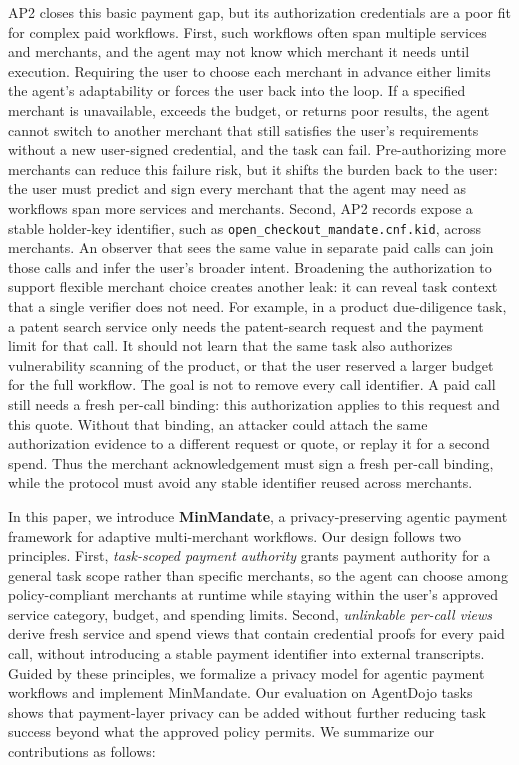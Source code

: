 \documentclass[letterpaper]{article}
\newcommand{\system}{MinMandate\xspace}
\begin{document}
AP2 closes this basic payment gap, but its authorization credentials are a poor fit for complex paid workflows. 
First, such workflows often span multiple services and merchants, and the agent may not know which merchant it needs until execution.
Requiring the user to choose each merchant in advance either limits the agent's adaptability or forces the user back into the loop. 
If a specified merchant is unavailable, exceeds the budget, or returns poor results, the agent cannot switch to another merchant that still satisfies the
user's requirements without a new user-signed credential, and the task can fail.
Pre-authorizing more merchants can reduce this failure risk, but it shifts the
burden back to the user: the user must predict and sign every merchant that the
agent may need as workflows span more services and merchants.
Second, AP2 records expose a stable holder-key identifier, such as \texttt{open\_checkout\_mandate.cnf.kid}, across merchants.
An observer that sees the same value in separate paid calls can join those calls and infer the user's broader intent. 
Broadening the authorization to support flexible merchant choice creates another leak: it can reveal task context that a single
verifier does not need. For example, in a product due-diligence task, a patent
search service only needs the patent-search request and the payment limit for
that call. It should not learn that the same task also authorizes vulnerability
scanning of the product, or that the user reserved a larger budget for the full
workflow.
The goal is not to remove every call identifier. A paid call still needs a
fresh per-call binding: this authorization applies to this request and this
quote. Without that binding, an attacker could attach the same authorization
evidence to a different request or quote, or replay it for a second spend.
Thus the merchant acknowledgement must sign a fresh per-call binding, while
the protocol must avoid any stable identifier reused across merchants.


In this paper, we introduce
\textbf{\system}, a privacy-preserving agentic payment framework for adaptive
multi-merchant workflows. Our design follows two principles. First,
\textit{task-scoped payment authority} grants payment authority for a general
task scope rather than specific merchants, so the agent can choose among
policy-compliant merchants at runtime while staying within the user's approved service
category, budget, and spending limits. Second, \textit{unlinkable per-call
views} derive fresh service and spend views that contain credential proofs for
every paid call, without introducing a stable payment identifier
into external transcripts. Guided by these principles, we formalize a privacy
model for agentic payment workflows and implement \system. Our
evaluation on AgentDojo tasks shows that payment-layer privacy can
be added without further reducing task success beyond what the approved policy
permits. We summarize our contributions as follows:
\end{document}

